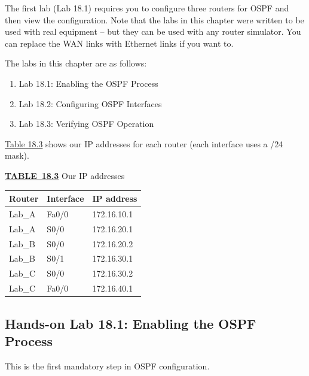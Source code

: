 \protect\hypertarget{c18.xhtmlux5cux23Page_773}{}{}The first lab (Lab
18.1) requires you to configure three routers for OSPF and then view the
configuration. Note that the labs in this chapter were written to be
used with real equipment -- but they can be used with any router
simulator. You can replace the WAN links with Ethernet links if you want
to.

The labs in this chapter are as follows:

\begin{enumerate}
\item
  Lab 18.1: Enabling the OSPF Process
\item
  Lab 18.2: Configuring OSPF Interfaces
\item
  Lab 18.3: Verifying OSPF Operation
\end{enumerate}

\protect\hyperlink{c18.xhtmlux5cux23table18-3}{Table 18.3} shows our IP
addresses for each router (each interface uses a /24 mask).

{\protect\hyperlink{c18.xhtmlux5cux23tableanchor18-3}{\textbf{TABLE~18.3}}
Our IP addresses}

\begin{longtable}[]{@{}lll@{}}
\toprule
Router & Interface & IP address\tabularnewline
\midrule
\endhead
Lab\_A & Fa0/0 & 172.16.10.1\tabularnewline
Lab\_A & S0/0 & 172.16.20.1\tabularnewline
Lab\_B & S0/0 & 172.16.20.2\tabularnewline
Lab\_B & S0/1 & 172.16.30.1\tabularnewline
Lab\_C & S0/0 & 172.16.30.2\tabularnewline
Lab\_C & Fa0/0 & 172.16.40.1\tabularnewline
\bottomrule
\end{longtable}

\subsection[Hands-on Lab 18.1: Enabling the OSPF
Process]{\texorpdfstring{\protect\hypertarget{c18.xhtmlux5cux23c18-sec-21}{}{}Hands-on
Lab 18.1: Enabling the OSPF
Process}{Hands-on Lab 18.1: Enabling the OSPF Process}}

This is the first mandatory step in OSPF configuration.

